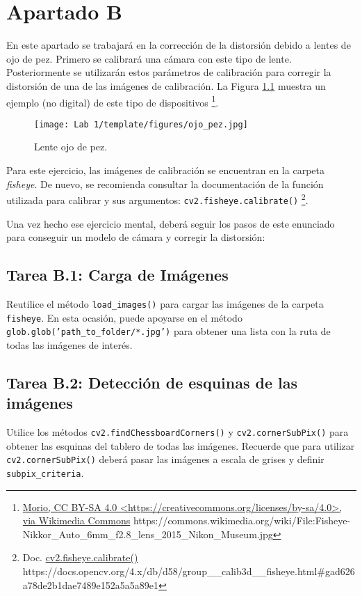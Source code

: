 \chapter{Apartado B}
\label{chapter:tarea_b}

En este apartado se trabajará en la corrección de la distorsión debido a lentes de ojo de pez. Primero se calibrará una cámara con este tipo de lente. Posteriormente se utilizarán estos parámetros de calibración para corregir la distorsión de una de las imágenes de calibración. La Figura \ref{fig:fisheye_camera} muestra un ejemplo (no digital) de este tipo de dispositivos \footnote{ \href{https://commons.wikimedia.org/wiki/File:Fisheye-Nikkor\_Auto\_6mm\_f2.8\_lens\_2015\_Nikon\_Museum.jpg}{Morio, CC BY-SA 4.0 <https://creativecommons.org/licenses/by-sa/4.0>, via Wikimedia Commons} https://commons.wikimedia.org/wiki/File:Fisheye-Nikkor\_Auto\_6mm\_f2.8\_lens\_2015\_Nikon\_Museum.jpg}.

\begin{figure}[h]
    \centering
    \texttt{[image: Lab 1/template/figures/ojo\_pez.jpg]}
    \caption{Lente ojo de pez.}
    \label{fig:fisheye_camera}
\end{figure}

Para este ejercicio, las imágenes de calibración se encuentran en la carpeta \textit{fisheye}. De nuevo, se recomienda consultar la documentación de la función utilizada para calibrar y sus argumentos: \texttt{cv2.fisheye.calibrate()} \footnote{Doc. \href{https://docs.opencv.org/4.x/db/d58/group\_\_calib3d\_\_fisheye.html\#gad626a78de2b1dae7489e152a5a5a89e}{cv2.fisheye.calibrate()} https://docs.opencv.org/4.x/db/d58/group\_\_calib3d\_\_fisheye.html\#gad626a78de2b1dae7489e152a5a5a89e1}. 

Una vez hecho ese ejercicio mental, deberá seguir los pasos de este enunciado para conseguir un modelo de cámara y corregir la distorsión:

\section*{Tarea B.1: Carga de Imágenes}
Reutilice el método \texttt{load\_images()} para cargar las imágenes de la carpeta \texttt{fisheye}. En esta ocasión, puede apoyarse en el método \texttt{glob.glob('path\_to\_folder/*.jpg')} para obtener una lista con la ruta de todas las imágenes de interés.


\section*{Tarea B.2: Detección de esquinas de las imágenes}
Utilice los métodos \texttt{cv2.findChessboardCorners()} y \texttt{cv2.cornerSubPix()} para obtener las esquinas del tablero de todas las imágenes. Recuerde que para utilizar \texttt{cv2.cornerSubPix()} deberá pasar las imágenes a escala de grises y definir \texttt{subpix\_criteria}.

